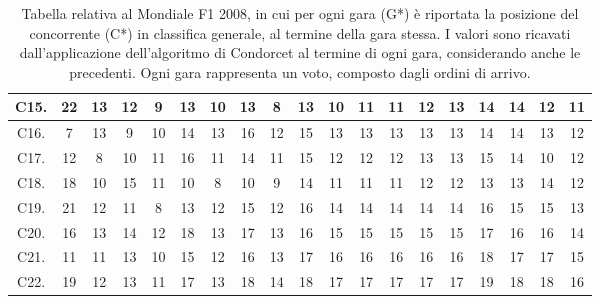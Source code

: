 \documentclass[12pt,a4paper,openright,twoside]{book}
\begin{document}
\begin{table}[H]
{\begin{tabular}{|c|c|c|c|c|c|c|c|c|c|c|c|c|c|c|c|c|c|c|}
    C15.  & 22 & 13 & 12 & 9 & 13 & 10 & 13 & 8 & 13 & 10 & 11 & 11 & 12 & 13 & 14 & 14 & 12 & 11 \\ \hline
    C16.  & 7 & 13 & 9 & 10 & 14 & 13 & 16 & 12 & 15 & 13 & 13 & 13 & 13 & 13 & 14 & 14 & 13 & 12 \\ \hline
    C17.  & 12 & 8 & 10 & 11 & 16 & 11 & 14 & 11 & 15 & 12 & 12 & 12 & 13 & 13 & 15 & 14 & 10 & 12 \\ \hline
    C18. & 18 & 10 & 15 & 11 & 10 & 8 & 10 & 9 & 14 & 11 & 11 & 11 & 12 & 12 & 13 & 13 & 14 & 12 \\ \hline
    C19.  & 21 & 12 & 11 & 8 & 13 & 12 & 15 & 12 & 16 & 14 & 14 & 14 & 14 & 14 & 16 & 15 & 15 & 13 \\ \hline
    C20.  & 16 & 13 & 14 & 12 & 18 & 13 & 17 & 13 & 16 & 15 & 15 & 15 & 15 & 15 & 17 & 16 & 16 & 14 \\ \hline
    C21. & 11 & 11 & 13 & 10 & 15 & 12 & 16 & 13 & 17 & 16 & 16 & 16 & 16 & 16 & 18 & 17 & 17 & 15 \\ \hline
    C22.  & 19 & 12 & 13 & 11 & 17 & 13 & 18 & 14 & 18 & 17 & 17 & 17 & 17 & 17 & 19 & 18 & 18 & 16 \\ \hline
    \end{tabular}}
    \endgroup
    \caption{Tabella relativa al Mondiale F1 2008, in cui per ogni gara (G*)  è riportata la posizione del concorrente (C*) in classifica generale, al termine della gara stessa.
    I valori sono ricavati dall'applicazione dell'algoritmo di Condorcet al termine di ogni gara, considerando anche le precedenti.
    Ogni gara rappresenta un voto, composto dagli ordini di arrivo.
    }
    \label{table:classifichegeneralicondorcet2008tabella}
\end{table}
\end{document}
